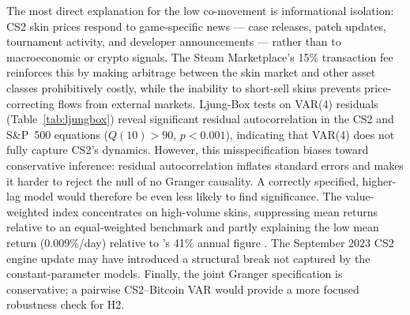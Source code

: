 The most direct explanation for the low co-movement is informational isolation:
CS2 skin prices respond to game-specific news --- case releases, patch updates,
tournament activity, and developer announcements --- rather than to
macroeconomic or crypto signals. The Steam Marketplace's 15\% transaction fee
reinforces this by making arbitrage between the skin market and other asset
classes prohibitively costly, while the inability to short-sell skins prevents
price-correcting flows from external markets. Ljung-Box tests on VAR(4)
residuals (Table~\ref{tab:ljungbox}) reveal significant residual autocorrelation
in the CS2 and S\&P~500 equations ($Q(10) > 90$, $p < 0.001$), indicating that
VAR(4) does not fully capture CS2's dynamics. However, this misspecification
biases toward conservative inference: residual autocorrelation inflates standard
errors and makes it harder to reject the null of no Granger causality. A
correctly specified, higher-lag model would therefore be even less likely to find
significance. The value-weighted index concentrates on high-volume skins,
suppressing mean returns relative to an equal-weighted benchmark and partly
explaining the low mean return (0.009\%/day) relative to
\citeauthor{dobrynskaya2025videogame}'s 41\% annual figure
\cite{dobrynskaya2025videogame}. The September 2023 CS2 engine update may have
introduced a structural break not captured by the constant-parameter models.
Finally, the joint Granger specification is conservative; a pairwise CS2--Bitcoin
VAR would provide a more focused robustness check for H2.
